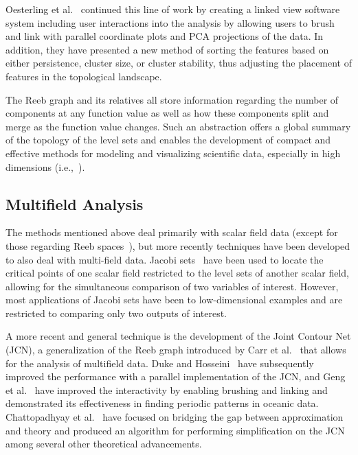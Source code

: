 Oesterling et al.~\cite{OesterlingHeineGunther2013} continued this line of work by creating a linked view software system including user interactions into the analysis by allowing users to brush and link with parallel coordinate plots and PCA projections of the data.
%
In addition, they have presented a new method of sorting the features based on either persistence, cluster size, or cluster stability, thus adjusting the placement of features in the topological landscape.


The Reeb graph and its relatives all store information regarding the number of components at any function value as well as how these components split and merge as the function value changes.
%
Such an abstraction offers a global summary of the topology of the level sets and enables the development of compact and effective methods for modeling and visualizing scientific data, especially in high dimensions (i.e.,~\cite{SinghMemoliCarlsson2007,NicolauLevineCarlsson2011}).

\subsection{Multifield Analysis}

The methods mentioned above deal primarily with scalar field data (except for those regarding Reeb spaces~\cite{MunchWang2016,CarrGengTierny2015,KlacanskyTiernyCarr2016,TiernyCarr2016}), but more recently techniques have been developed to also deal with multi-field data.
%
Jacobi sets~\cite{EdelsbrunnerHarer2002} have been used to locate the critical points of one scalar field restricted to the level sets of another scalar field, allowing for the simultaneous comparison of two variables of interest.
%
However, most applications of Jacobi sets have been to low-dimensional examples and are restricted to comparing only two outputs of interest.

A more recent and general technique is the development of the Joint Contour Net (JCN), a generalization of the Reeb graph introduced by Carr et al.~\cite{CarrDuke2014,DukeCarrKnoll2012} that allows for the analysis of multifield data.
%
Duke and Hosseini~\cite{DukeHosseini2015} have subsequently improved the performance with a parallel implementation of the JCN, and Geng et al.~\cite{GengDukeCarr2015} have improved the interactivity by enabling brushing and linking and demonstrated its effectiveness in finding periodic patterns in oceanic data.
%
Chattopadhyay et al.~\cite{ChattopadhyayCarrDuke2014,ChattopadhyayCarrDuke2016} have focused on bridging the gap between approximation and theory and produced an algorithm for performing simplification on the JCN among several other theoretical advancements.


